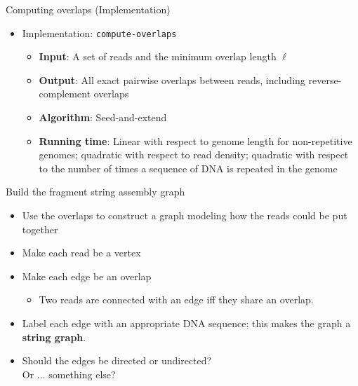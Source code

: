 \documentclass[xcolor=dvipsnames]{beamer}
\begin{document}
\begin{frame}{Computing overlaps (Implementation)}
	\begin{itemize}
		\item Implementation: {\tt compute-overlaps}
			\begin{itemize}
				\item {\bf Input}:  A set of reads and the minimum overlap
				length $\ell$
				\item {\bf Output}:  All exact pairwise overlaps between reads,
				including reverse-complement overlaps
				\item {\bf Algorithm}:  Seed-and-extend
				\item {\bf Running time}: Linear with respect to genome length
				for non-repetitive genomes; quadratic with respect to read
					density; quadratic with respect to the number of times a
					sequence of DNA is repeated in the genome
			\end{itemize}
	\end{itemize}
\end{frame}

\begin{frame}{Build the fragment string assembly graph}
	\begin{itemize}
		
		\item Use the overlaps to construct a graph modeling how the reads could
		be put together
		\item Make each read be a vertex
		\item Make each edge be an overlap
		\begin{itemize}
			\item Two reads are connected with an edge iff they share an overlap.
		\end{itemize}
		\item Label each edge with an appropriate DNA sequence; this makes the
		graph a {\bf string graph}.
		\item Should the edges be directed or undirected?  \\Or $\dots$ something
		else?
	\end{itemize}
\end{frame}
\end{document}

